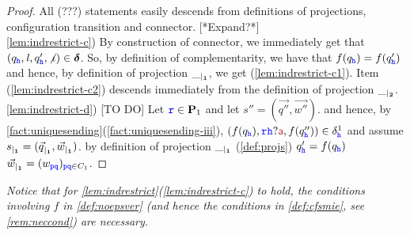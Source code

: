 \begin{proof}
All (???) statements easily
descends from definitions of projections, configuration transition and connector.
[*Expand?*]\\
\ref{lem:indrestrict-c})
By construction of connector, we immediately get that $(q_{\mathtt{\color{blue}{ {h}}}},\mathit{l},q'_{\mathtt{\color{blue}{ {h}}}},\not\iota)\in\bm{\delta}$.
So, by definition of complementarity, we have that $f(q_{\mathtt{\color{blue}{ {h}}}})=f(q'_{\mathtt{\color{blue}{ {h}}}})$ and hence,
by definition of projection ${\_}_{\mid_{\mathbf{1}}}$, we get (\ref{lem:indrestrict-c1}).
Item (\ref{lem:indrestrict-c2}) descends immediately from the definition of projection 
${\_}_{\mid_{\mathbf{2}}}$.\\
\ref{lem:indrestrict-d}) [TO DO]
Let ${\mathtt{\color{blue}{ {r}}}}\in\mathbf{P}_1$ and let $s''= (\vec{q''},\vec{w''})$.
and hence, by \cref{fact:uniquesending}(\ref{fact:uniquesending-iii}),
$(f(q_\HH),\ttr\HH?\msg[a],f(q''_\HH))\in\delta^1_\HH$
 and assume
${s}_{\mid_{\mathbf{1}}}=({\vec{q}}_{\mid_{\mathbf{1}}},{\vec{w}}_{\mid_{\mathbf{1}}})$.
by definition of projection ${\_}_{\mid_{\mathbf{1}}}$ (\cref{def:projs}) $q'_{\mathtt{\color{blue}{ {h}}}} = f(q_{\mathtt{\color{blue}{ {h}}}})$ 
${\vec{w}}_{\mid_{\mathbf{1}}} =  (w_{{\mathtt{\color{blue}{ {p}}}}{\mathtt{\color{blue}{ {q}}}}})_{{\mathtt{\color{blue}{ {p}}}}{\mathtt{\color{blue}{ {q}}}}\in C_1}$.
\end{proof}

\begin{remark}{\em
Notice that for \cref{lem:indrestrict}(\ref{lem:indrestrict-c}) to hold,  
the conditions involving $f$ in \cref{def:noepsver} (and hence the conditions in \cref{def:cfsmie},
see \cref{rem:neccond}) are necessary.\finex
}
\end{remark}



